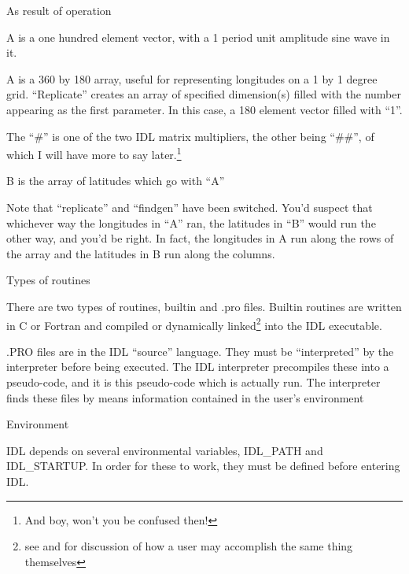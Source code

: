 \documentclass{article}
\begin{document}
        \item As result of operation


	   A is a one hundred element vector, with a 1 period unit
           amplitude  sine wave in it.


	  A is a 360 by 180 array, useful for representing longitudes
          on a 1 by 1 degree grid. ``Replicate'' creates an array of
          specified dimension(s) filled with the number appearing as
          the first parameter. In this case, a 180 element vector
          filled with ``1''.

          The ``\#'' is one of the two IDL matrix multipliers, the
          other being ``\#\#'', of which I will have more to say
          later.\footnote{And boy, won't you be confused then!}


   	  B is the array of latitudes which go with ``A''

          Note that ``replicate'' and ``findgen'' have been
          switched. You'd suspect that whichever way the longitudes in
          ``A'' ran, the latitudes in ``B'' would run the other way,
          and you'd be right. In fact, the longitudes in A run along
          the rows of the array and the latitudes in B run along
          the columns.
          
     \ei

  \item Types of routines
	
    There are two types of routines, builtin and .pro files. Builtin
    routines are written in C or Fortran and compiled or dynamically
    linked\footnote{see  and  for
    discussion of how a user may accomplish the same thing themselves}
    into the IDL executable.

    .PRO files are in the IDL ``source'' language. They must be
    ``interpreted'' by the interpreter before being executed. The IDL
    interpreter precompiles these into a pseudo-code, and it is this
    pseudo-code which is actually run. The interpreter finds these
    files by means information contained in the user's environment

  \item Environment

     IDL depends on several environmental variables, IDL\_PATH and
     IDL\_STARTUP. In order for these to work, they must be defined
     before entering IDL.
\end{document}
